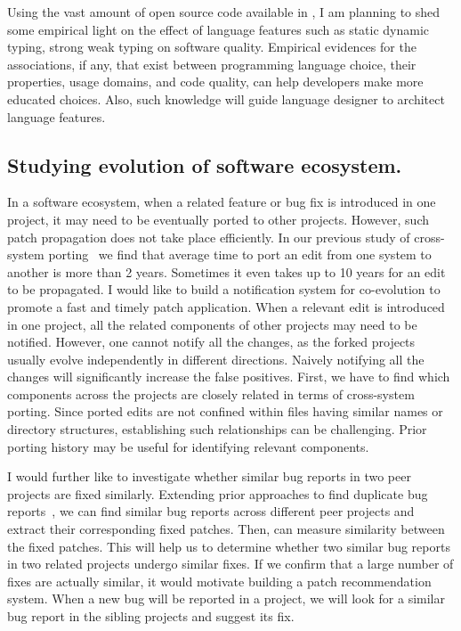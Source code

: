 \documentclass[a4paper, 11pt]{article}
\begin{document}
\begin{small}
Using the vast amount of open source code available  in \gh, I am planning to shed some empirical light 
on the effect of language features such as static \vs dynamic typing, strong \vs weak typing on software quality. 
Empirical evidences for the associations,  if any,  that exist between programming language
choice, their properties, usage domains, and code quality, can help developers make more
educated choices. Also, such knowledge will guide language designer to architect language features.


\subsection*{\small Studying evolution of software ecosystem.}

In a software ecosystem, when a related feature or bug fix is introduced in one project, it may need to be eventually ported to other projects.
However, such patch propagation does not take place efficiently. In our previous study of cross-system porting~\cite{Ray2012} we find that average time to port an edit from one system to another is more than 2 years. Sometimes it even takes up to 10 years for an edit to be propagated.
I would like to build a notification system for co-evolution to promote a fast and timely patch application. When a relevant edit is introduced in one project, all the related components of other projects may need to be notified. However, one cannot notify all the changes, as the forked projects usually evolve independently in different directions. Naively notifying all the changes will significantly increase the false positives. First, we have to find which components across the projects are closely related in terms of cross-system porting. Since ported edits are not confined within files having similar names or directory structures, establishing such relationships can be challenging. Prior porting history may be useful for identifying relevant components. 

I would further like to investigate whether similar bug reports in two peer projects are fixed similarly. 
Extending prior approaches to find duplicate bug reports~\cite{dupBugReport:Wang:ICSE2008,dupBugReport:Nguyen:ASE2012}, 
we can find similar bug reports across different peer projects and extract their corresponding fixed patches. 
Then, {\rep} can measure similarity between the fixed patches. This will help us to determine whether two similar bug reports in two related projects undergo similar fixes. If we confirm that a large number of fixes are actually similar, it would motivate building a patch recommendation system. When a new bug will be reported in a project, we will look for a similar bug report in the  sibling projects and suggest its fix. 


\end{small}
\end{document}
